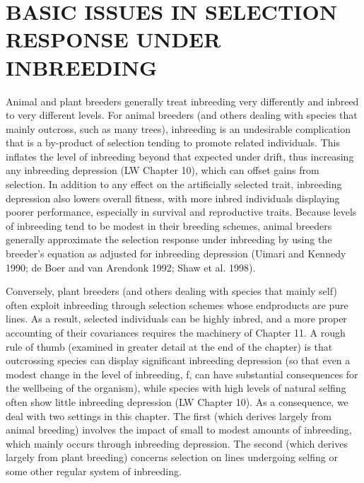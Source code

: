 \documentclass{article}
\begin{document}
\section{BASIC ISSUES IN SELECTION RESPONSE UNDER INBREEDING}
Animal and plant breeders generally treat inbreeding very differently and inbreed to very different levels. For animal breeders (and others dealing with species that mainly outcross, such as many trees), inbreeding is an undesirable complication that is a by-product of selection tending to promote related individuals. This inflates the level of inbreeding beyond that expected under drift, thus increasing any inbreeding depression (LW Chapter 10), which can offset gains from selection. In addition to any effect on the artificially selected trait, inbreeding depression also lowers overall fitness, with more inbred individuals displaying poorer performance, especially in survival and reproductive traits. Because levels of inbreeding tend to be modest in their breeding schemes, animal breeders generally approximate the selection response under inbreeding by using the breeder's equation as adjusted for inbreeding depression (Uimari and Kennedy 1990; de Boer and van Arendonk 1992; Shaw et al. 1998).

Conversely, plant breeders (and others dealing with species that mainly self) often exploit inbreeding through selection schemes whose endproducts are pure lines. As a result, selected individuals can be highly inbred, and a more proper accounting of their covariances requires the machinery of Chapter 11. A rough rule of thumb (examined in greater detail at the end of the chapter) is that outcrossing species can display significant inbreeding depression (so that even a modest change in the level of inbreeding, f, can have substantial consequences for the wellbeing of the organism), while species with high levels of natural selfing often show little inbreeding depression (LW Chapter 10). As a consequence, we deal with two settings in this chapter. The first (which derives largely from animal breeding) involves the impact of small to modest amounts of inbreeding, which mainly occurs through inbreeding depression. The second (which derives largely from plant breeding) concerns selection on lines undergoing selfing or some other regular system of inbreeding.
\end{document}
